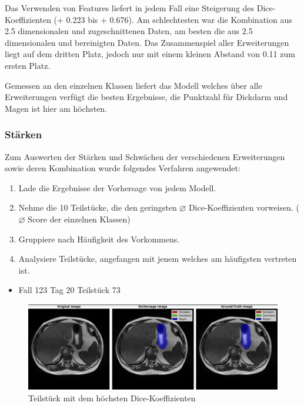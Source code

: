 Das Verwenden von Features liefert in jedem Fall eine Steigerung des Dice-Koeffizienten (+ 0.223 bis + 0.676). Am schlechtesten war die Kombination aus 2.5 dimensionalen und zugeschnittenen Daten, am besten die aus 2.5 dimensionalen und bereinigten Daten. Das Zusammenspiel aller Erweiterungen liegt auf dem dritten Platz, jedoch nur mit einem kleinen Abstand von 0.11 zum ersten Platz. 

Gemessen an den einzelnen Klassen liefert das Modell welches über alle Erweiterungen verfügt die besten Ergebnisse, die Punktzahl für Dickdarm und Magen ist hier am höchsten. 

\subsubsection{Stärken}

Zum Auswerten der Stärken und Schwächen der verschiedenen Erweiterungen sowie deren Kombination wurde folgendes Verfahren angewendet:

\begin{enumerate}
\item Lade die Ergebnisse der Vorhersage von jedem Modell.
\item Nehme die 10 Teilstücke, die den geringsten $
\varnothing
$ Dice-Koeffizienten vorweisen. ($\varnothing$ Score der einzelnen Klassen) 
\item  Gruppiere nach Häufigkeit des Vorkommens.
\item Analysiere Teilstücke, angefangen mit jenem welches am häufigsten vertreten ist.
\end{enumerate}

\begin{itemize}
\item Fall 123 Tag 20 Teilstück 73
\end{itemize}

\begin{figure}[H]
	\begin{center}
		\includegraphics[width=400pt]{LaTex/bilder/case123_day20_slice_0073.png}
		\caption{ Teilstück mit dem höchsten Dice-Koeffizienten }\label{Fig:7vs1}
	\end{center}
\end{figure}

